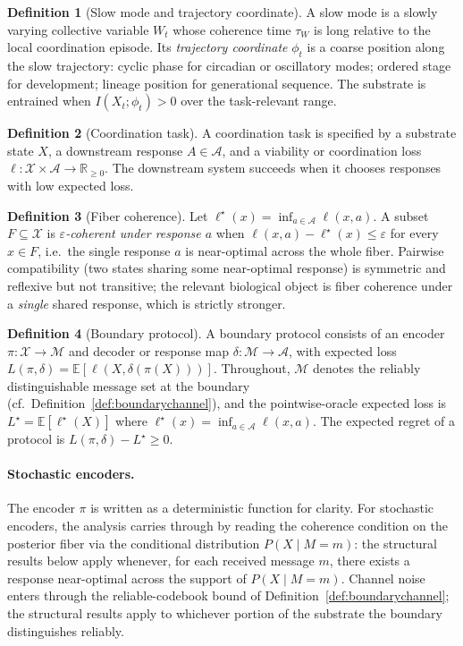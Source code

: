 \documentclass[12pt]{article}
\theoremstyle{definition}
\newtheorem{definition}{Definition}
\newcommand{\X}{\mathcal{X}}
\newcommand{\A}{\mathcal{A}}
\newcommand{\M}{\mathcal{M}}
\newcommand{\R}{\mathbb{R}}
\newcommand{\E}{\mathbb{E}}
\newcommand{\I}{I}
\newcommand{\loss}{\ell}
\newcommand{\eps}{\varepsilon}
\begin{document}
\begin{definition}[Slow mode and trajectory coordinate]
\label{def:slowmode}
A slow mode is a slowly varying collective variable $W_t$ whose coherence time $\tau_W$ is long relative to the local coordination episode. Its \emph{trajectory coordinate} $\phi_t$ is a coarse position along the slow trajectory: cyclic phase for circadian or oscillatory modes; ordered stage for development; lineage position for generational sequence. The substrate is entrained when $\I(X_t;\phi_t)>0$ over the task-relevant range.
\end{definition}

\begin{definition}[Coordination task]
A coordination task is specified by a substrate state $X$, a downstream response $A \in \A$, and a viability or coordination loss $\loss : \X \times \A \to \R_{\geq 0}$. The downstream system succeeds when it chooses responses with low expected loss.
\end{definition}

\begin{definition}[Fiber coherence]
\label{def:fiber}
Let $\loss^\star(x)=\inf_{a\in\A}\loss(x,a)$. A subset $F\subseteq\X$ is \emph{$\eps$-coherent under response $a$} when $\loss(x,a)-\loss^\star(x)\leq\eps$ for every $x\in F$, i.e.\ the single response $a$ is near-optimal across the whole fiber. Pairwise compatibility (two states sharing some near-optimal response) is symmetric and reflexive but not transitive; the relevant biological object is fiber coherence under a \emph{single} shared response, which is strictly stronger.
\end{definition}

\begin{definition}[Boundary protocol]
A boundary protocol consists of an encoder $\pi:\X\to\M$ and decoder or response map $\delta:\M\to\A$, with expected loss $L(\pi,\delta) = \E[\loss(X,\delta(\pi(X)))]$. Throughout, $\M$ denotes the reliably distinguishable message set at the boundary (cf.\ Definition~\ref{def:boundarychannel}), and the pointwise-oracle expected loss is $L^\star = \E[\loss^\star(X)]$ where $\loss^\star(x) = \inf_{a\in\A}\loss(x,a)$. The expected regret of a protocol is $L(\pi,\delta) - L^\star \geq 0$.
\end{definition}

\paragraph{Stochastic encoders.} The encoder $\pi$ is written as a deterministic function for clarity. For stochastic encoders, the analysis carries through by reading the coherence condition on the posterior fiber via the conditional distribution $P(X\mid M=m)$: the structural results below apply whenever, for each received message $m$, there exists a response near-optimal across the support of $P(X\mid M=m)$. Channel noise enters through the reliable-codebook bound of Definition~\ref{def:boundarychannel}; the structural results apply to whichever portion of the substrate the boundary distinguishes reliably.
\end{document}
